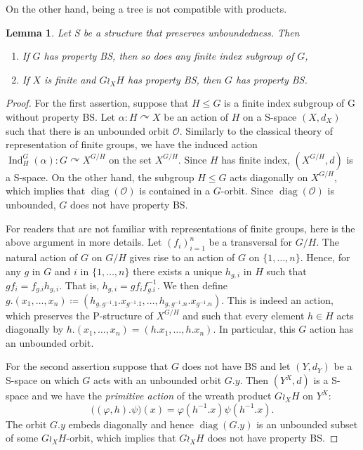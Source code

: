 \documentclass[a4paper]{article}
\newtheorem{lem}{Lemma}[section]
\theoremstyle{definition}
\theoremstyle{remark}%
\DeclareMathOperator\Ind{Ind}
\DeclareMathOperator\diag{diag}
\newcommand*{\orbite}{\mathcal O}
\begin{document}
On the other hand, being a tree is not compatible with products.
%
%
\begin{lem}\label{Lemma:Unboundedness}
Let S be a structure that preserves unboundedness. Then
\begin{enumerate}
\item If $G$ has property BS, then so does any finite index subgroup of $G$,
\item If $X$ is finite and $G\wr_XH$ has property BS, then $G$ has property BS.
\end{enumerate}
\end{lem}
\begin{proof}
For the first assertion, suppose that $H\leq G$ is a finite index subgroup of G without property BS.
Let $\alpha\colon H\curvearrowright X$ be an action of $H$ on a S-space $(X,d_X)$ such that there is an unbounded orbit $\orbite$.
Similarly to the classical theory of representation of finite groups, we have the induced  action $\Ind_H^G(\alpha)\colon G \curvearrowright X^{G/H}$ on the set $X^{G/H}$. Since $H$ has finite index, $(X^{G/H},d)$ is a S-space. On the other hand, the subgroup $H\leq G$ acts diagonally on $X^{G/H}$, which implies that $\diag(\orbite)$ is contained in a $G$-orbit.
Since $\diag(\orbite)$ is unbounded, $G$ does not have property BS.

For readers that are not familiar with representations of finite groups, here is the above argument in more details.
Let $(f_i)_{i=1}^n$ be a transversal for $G/H$.
The natural action of $G$ on $G/H$ gives rise to an action of $G$ on $\{1,\dots,n\}$.
Hence, for any $g$ in $G$ and $i$ in $\{1,\dots,n\}$ there exists a unique $h_{g,i}$ in $H$ such that $gf_i=f_{g.i}h_{g,i}$. That is, $h_{g,i}=gf_if_{g.i}^{-1}$.
We then define $g.(x_1,\dots,x_n)\coloneqq(h_{g,g^{-1}.1}.x_{g^{-1}.1},\dots,h_{g,g^{-1}.n}.x_{g^{-1}.n})$. This is indeed an action, which preserves the P-structure of $X^{G/H}$ and such that every element $h\in H$ acts diagonally by $h.(x_1,\dots,x_n)=(h.x_1,\dots,h.x_n)$.
In particular, this $G$ action has an unbounded orbit.

For the second assertion suppose that $G$ does not have BS and let $(Y,d_Y)$ be a S-space on which $G$ acts with an unbounded orbit $G.y$.
Then $(Y^X,d)$ is a S-space and we have the \emph{primitive action} of the wreath product $G\wr_XH$ on $Y^X$:
\[
	\bigl((\varphi,h).\psi\bigr)(x)=\varphi(h^{-1}.x)\psi(h^{-1}.x).
\]
The orbit $G.y$ embeds diagonally and hence $\diag(G.y)$ is an unbounded subset of some $G\wr_XH$-orbit, which implies that $G\wr_XH$ does not have property BS.
\end{proof}
\end{document}
